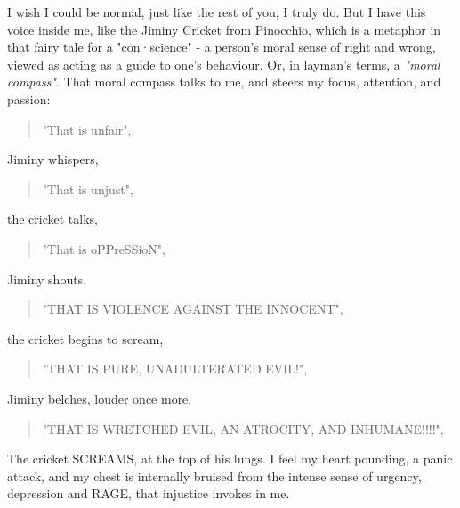 \documentclass[16pt,openany,oneside]{book}
\begin{document}
I wish I could be normal, just like the rest of you, I truly do. 
But I have this voice inside me, like the Jiminy Cricket from Pinocchio, 
which is a metaphor in that fairy tale for a 
"con·science" - a person's moral sense of right and wrong, 
viewed as acting as a guide to one's behaviour.
Or, in layman's terms, a \emph{"moral compass"}. 
That moral compass talks to me, and steers my focus, attention, and passion:
\begin{quote}
    "That is unfair", 
\end{quote}
Jiminy whispers,
\begin{quote}
    "That is unjust", 
\end{quote}
the cricket talks,
\begin{quote}
    "That is oPPreSSioN", 
\end{quote}
Jiminy shouts,
\begin{quote}
    "THAT IS VIOLENCE AGAINST THE INNOCENT", 
\end{quote}    
the cricket begins to scream,
\begin{quote}
    "THAT IS PURE, UNADULTERATED EVIL!", 
 \end{quote}   
Jiminy belches, louder once more.
\begin{quote}
    "THAT IS WRETCHED EVIL, AN ATROCITY, AND INHUMANE!!!!",
\end{quote}
The cricket SCREAMS, at the top of his lungs. I feel my heart pounding, a panic attack, and my chest is internally bruised from the intense sense of urgency, depression and RAGE, that injustice invokes in me. 
\end{document}
